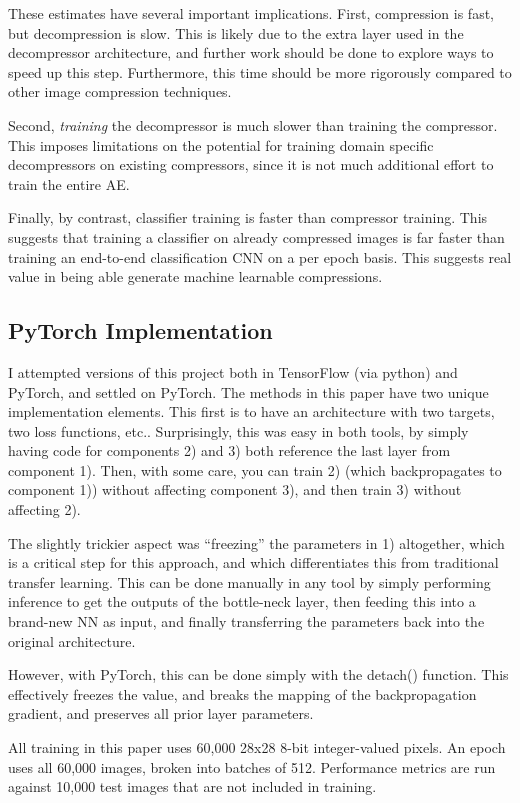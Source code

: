 \documentclass[twoside,11pt]{article}
\begin{document}
These estimates have several important implications. First, compression is fast,
but decompression is slow. This is likely due to the extra layer used in the 
decompressor architecture, and further work should be done to explore ways to speed up this step.
Furthermore, this time should be more rigorously compared to other image compression techniques.

Second, \emph{training} the decompressor is much slower than training the
compressor.
This imposes limitations on the potential for training domain specific decompressors on 
existing compressors, since it is not much additional effort to train the entire AE.

Finally, by contrast, classifier training is faster than compressor training.
This suggests that training a classifier on already compressed images is far faster 
than training an end-to-end classification CNN on a per epoch basis. This suggests real 
value in being able generate machine learnable compressions.  

\subsection{PyTorch Implementation}

I attempted versions of this project both in TensorFlow (via python) and PyTorch, 
and settled on PyTorch.
The methods in this paper have two unique implementation elements.
This first is to have an architecture
with two targets, two loss functions, etc.. Surprisingly, this was easy in both tools, by
simply having code for components 2) and 3) both reference the last layer from component 1).
Then, with some care, you can train 2) (which backpropagates to component 1)) without 
affecting component 3), and then train 3) without affecting 2).

The slightly trickier aspect was ``freezing'' the parameters in 1) altogether, 
which is a critical step for this approach, and which differentiates this from traditional
transfer learning. This can be done manually in any tool by simply performing inference
to get the outputs of the bottle-neck layer, then feeding this into a brand-new NN as input,
and finally transferring the parameters back into the original architecture.

However, with PyTorch, this can be done simply with the detach() function.
This effectively freezes the value, and breaks the mapping of the backpropagation gradient, 
and preserves all prior layer parameters.

All training in this paper uses 60,000 28x28 8-bit integer-valued pixels.
An epoch uses all 60,000 images, broken into batches of 512. Performance metrics are
run against 10,000 test images that are not included in training.
\end{document}

